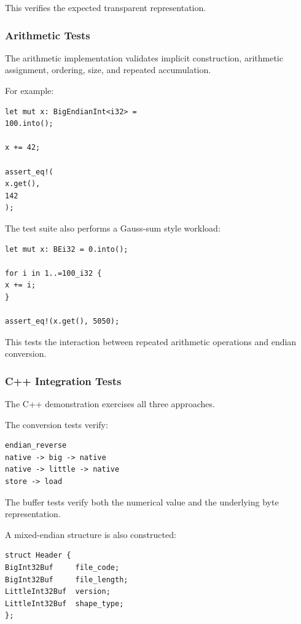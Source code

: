 This verifies the expected transparent representation.

\subsubsection{Arithmetic Tests}

The arithmetic implementation validates implicit construction, arithmetic assignment, ordering, size, and repeated accumulation.

For example:

\begin{lstlisting}[style=rustblock]
let mut x: BigEndianInt<i32> =
100.into();

x += 42;

assert_eq!(
x.get(),
142
);
\end{lstlisting}

The test suite also performs a Gauss-sum style workload:

\begin{lstlisting}[style=rustblock]
let mut x: BEi32 = 0.into();

for i in 1..=100_i32 {
x += i;
}

assert_eq!(x.get(), 5050);
\end{lstlisting}

This tests the interaction between repeated arithmetic operations and endian conversion.

\subsubsection{C++ Integration Tests}

The C++ demonstration exercises all three approaches.

The conversion tests verify:

\begin{lstlisting}[style=textblock]
endian_reverse
native -> big -> native
native -> little -> native
store -> load
\end{lstlisting}

The buffer tests verify both the numerical value and the underlying byte representation.

A mixed-endian structure is also constructed:

\begin{lstlisting}[style=cppblock]
struct Header {
BigInt32Buf     file_code;
BigInt32Buf     file_length;
LittleInt32Buf  version;
LittleInt32Buf  shape_type;
};
\end{lstlisting}

